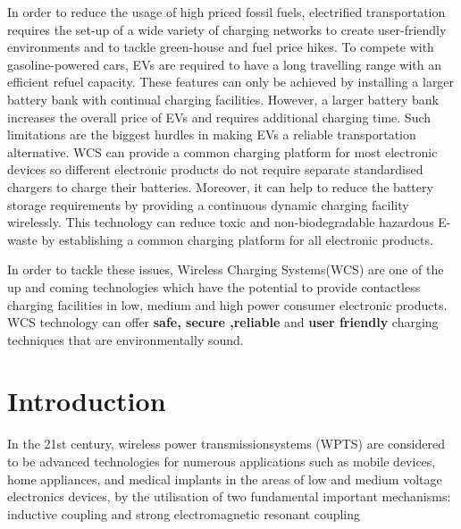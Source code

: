 \documentclass[12pt]{article}
\begin{document}
In order to reduce the usage of high priced fossil fuels, electrified transportation requires the set-up of a wide variety of charging networks to create user-friendly environments and to tackle green-house and fuel price hikes. To compete with gasoline-powered cars, EVs are required to have a long travelling range with an efficient refuel capacity. These features can only be achieved by installing a larger battery bank with continual charging facilities. However, a larger battery bank increases the overall price of EVs and requires additional charging time. Such limitations are the biggest hurdles in making EVs a reliable transportation alternative. WCS can provide a common charging platform for most electronic devices so different electronic products do not require separate standardised chargers to charge their batteries. Moreover, it can help to reduce the battery storage requirements by providing a continuous dynamic charging facility wirelessly. This technology can reduce toxic and non-biodegradable hazardous E-waste by establishing a common charging platform for all electronic products. %

In order to tackle these issues, Wireless Charging Systems(WCS) are one of the up and coming technologies which have the potential to provide contactless charging facilities in low, medium and high power consumer electronic products. WCS technology can offer \textbf{safe, secure ,reliable} and \textbf{user friendly} charging techniques that are environmentally sound. 
\section{Introduction}
In the 21st century, wireless power transmissionsystems (WPTS) are considered to be advanced technologies for numerous applications
such as mobile devices, home appliances, and medical implants in the areas of low and medium voltage electronics devices, by the utilisation of two fundamental important mechanisms: inductive coupling and strong electromagnetic resonant coupling %
\end{document}
